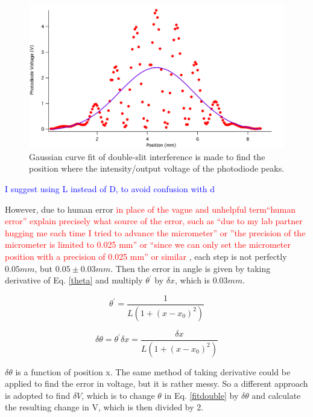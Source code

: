 \documentclass[prb,preprint]{revtex4-1}
\begin{document}
\begin{figure}[h]
\centering
\includegraphics[width=7in]{doublegaus.pdf}
\caption{Gaussian curve fit of double-slit interference is made to find the position where the intensity/output voltage of the photodiode peaks.}
\label{gasfit}
\end{figure}
\textcolor{blue}{I suggest using L instead of D, to avoid confusion with d}

However, due to human error \textcolor{red}{in place of the vague and unhelpful term``human error'' explain precisely what source of the error, such as ``due to my lab partner hugging me each time I tried to advance the micrometer'' or ''the precision of the micrometer is limited to 0.025 mm'' or ``since we can only set the micrometer position with a precision of 0.025 mm'' or similar} , each step is not perfectly $0.05 mm$, but $0.05\pm0.03 mm$.
Then the error in angle is given by taking derivative of Eq. \ref{theta} and multiply $\theta^\prime$ by $\delta x$, which is $0.03 mm$. 

\begin{equation}
\theta^\prime = \frac{1}{L(1+(x-x_0)^2)}
\label{thetaprime}
\end{equation}

\begin{equation}
\delta\theta = \theta^\prime \delta x = \frac{\delta x}{L(1+(x-x_0)^2)}
\label{deltatheta}
\end{equation}

$\delta\theta$ is a function of position x. The same method of taking derivative could be applied to find the error in voltage, but it is rather messy. So a different approach is adopted to find $\delta V$, which is to change $\theta$ in Eq. \ref{fitdouble} by $\delta\theta$ and calculate the resulting change in V, which is then divided by 2.
\end{document}
